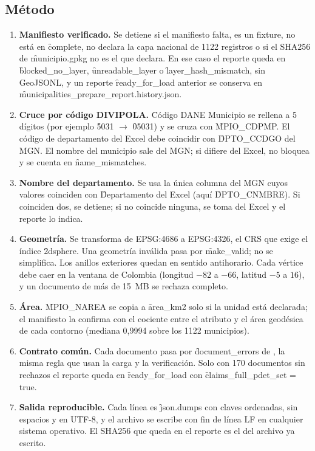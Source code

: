 \subsection{Método}

\begin{enumerate}
  \item \textbf{Manifiesto verificado.} Se detiene si el manifiesto falta, es un fixture, no está en \f{complete}, no declara la capa nacional de 1122 registros o si el SHA256 de \f{municipio.gpkg} no es el que declara. En ese caso el reporte queda en \f{blocked\_no\_layer}, \f{unreadable\_layer} o \f{layer\_hash\_mismatch}, sin GeoJSONL, y un reporte \f{ready\_for\_load} anterior se conserva en \f{municipalities\_prepare\_report.history.json}.
  \item \textbf{Cruce por código DIVIPOLA.} \f{Código DANE Municipio} se rellena a 5 dígitos (por ejemplo \f{5031} $\rightarrow$ \f{05031}) y se cruza con \f{MPIO\_CDPMP}. El código de departamento del Excel debe coincidir con \f{DPTO\_CCDGO} del MGN. El nombre del municipio sale del MGN; si difiere del Excel, no bloquea y se cuenta en \f{name\_mismatches}.
  \item \textbf{Nombre del departamento.} Se usa la única columna del MGN cuyos valores coinciden con \f{Departamento} del Excel (aquí \f{DPTO\_CNMBRE}). Si coinciden dos, se detiene; si no coincide ninguna, se toma del Excel y el reporte lo indica.
  \item \textbf{Geometría.} Se transforma de EPSG:4686 a EPSG:4326, el CRS que exige el índice \f{2dsphere}. Una geometría inválida pasa por \f{make\_valid}; no se simplifica. Los anillos exteriores quedan en sentido antihorario. Cada vértice debe caer en la ventana de Colombia (longitud $-82$ a $-66$, latitud $-5$ a $16$), y un documento de más de 15~MB se rechaza completo.
  \item \textbf{Área.} \f{MPIO\_NAREA} se copia a \f{area\_km2} solo si la unidad está declarada; el manifiesto la confirma con el cociente entre el atributo y el área geodésica de cada contorno (mediana 0,9994 sobre los 1122 municipios).
  \item \textbf{Contrato común.} Cada documento pasa por \f{document\_errors} de , la misma regla que usan la carga y la verificación. Solo con 170 documentos sin rechazos el reporte queda en \f{ready\_for\_load} con \f{claims\_full\_pdet\_set = true}.
  \item \textbf{Salida reproducible.} Cada línea es \f{json.dumps} con claves ordenadas, sin espacios y en UTF-8, y el archivo se escribe con fin de línea LF en cualquier sistema operativo. El SHA256 que queda en el reporte es el del archivo ya escrito.
\end{enumerate}

